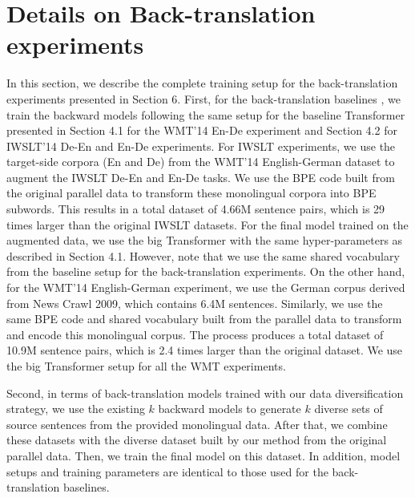 \documentclass{article}
\begin{document}
\section{Details on Back-translation experiments}\label{app:back_translation}
In this section, we describe the complete training setup for the back-translation experiments presented in Section 6. First, for the back-translation baselines \citep{backtranslate_sennrich-etal-2016-improving}, we train the backward models following the same setup for the baseline Transformer presented in Section 4.1 for the WMT'14 En-De experiment and Section 4.2 for IWSLT'14 De-En and En-De experiments. For IWSLT experiments, we use the target-side corpora (En and De) from the WMT'14 English-German dataset to augment the IWSLT De-En and En-De tasks. We use the BPE code built from the original parallel data to transform these monolingual corpora into BPE subwords. This results in a total dataset of 4.66M sentence pairs, which is 29 times larger than the original IWSLT datasets. For the final model trained on the augmented data, we use the big Transformer with the same hyper-parameters as described in Section 4.1. However, note that we use the same shared vocabulary from the baseline setup for the back-translation experiments. On the other hand, for the WMT'14 English-German experiment, we use the German corpus derived from News Crawl 2009, which contains 6.4M sentences. Similarly, we use the same BPE code and shared vocabulary built from the parallel data to transform and encode this monolingual corpus. The process produces a total dataset of 10.9M sentence pairs, which is 2.4 times larger than the original dataset. We use the big Transformer setup for all the WMT experiments.

Second, in terms of back-translation models trained with our data diversification strategy, we use the existing $k$ backward models to generate $k$ diverse sets of source sentences from the provided monolingual data. After that, we combine these datasets with the diverse dataset built by our method from the original parallel data. Then, we train the final model on this dataset. In addition, model setups and training parameters are identical to those used for the back-translation baselines.



 
\end{document}
